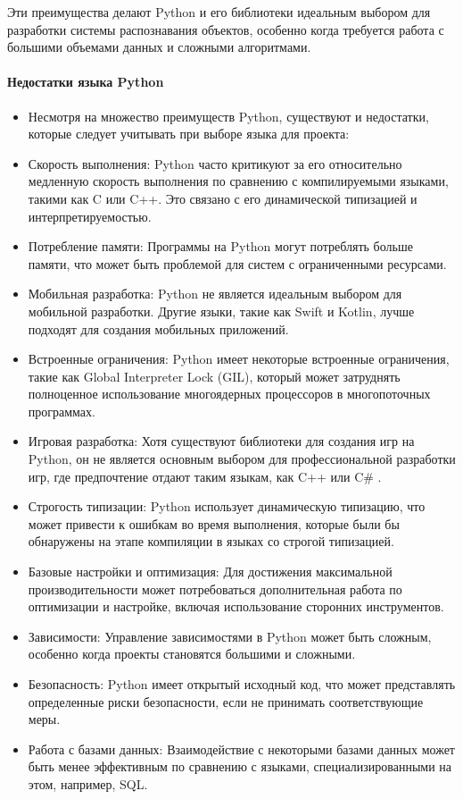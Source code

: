 Эти преимущества делают Python и его библиотеки идеальным выбором для разработки системы распознавания объектов, особенно когда требуется работа с большими объемами данных и сложными алгоритмами.

\paragraph{Недостатки языка Python}

\begin{itemize}
\item Несмотря на множество преимуществ Python, существуют и недостатки, которые следует учитывать при выборе языка для проекта:
\item Скорость выполнения: Python часто критикуют за его относительно медленную скорость выполнения по сравнению с компилируемыми языками, такими как C или C++. Это связано с его динамической типизацией и интерпретируемостью.
\item Потребление памяти: Программы на Python могут потреблять больше памяти, что может быть проблемой для систем с ограниченными ресурсами.
\item Мобильная разработка: Python не является идеальным выбором для мобильной разработки. Другие языки, такие как Swift и Kotlin, лучше подходят для создания мобильных приложений.
\item Встроенные ограничения: Python имеет некоторые встроенные ограничения, такие как Global Interpreter Lock (GIL), который может затруднять полноценное использование многоядерных процессоров в многопоточных программах.
\item Игровая разработка: Хотя существуют библиотеки для создания игр на Python, он не является основным выбором для профессиональной разработки игр, где предпочтение отдают таким языкам, как C++ или C\# .
\item Строгость типизации: Python использует динамическую типизацию, что может привести к ошибкам во время выполнения, которые были бы обнаружены на этапе компиляции в языках со строгой типизацией.
\item Базовые настройки и оптимизация: Для достижения максимальной производительности может потребоваться дополнительная работа по оптимизации и настройке, включая использование сторонних инструментов.
\item Зависимости: Управление зависимостями в Python может быть сложным, особенно когда проекты становятся большими и сложными.
\item Безопасность: Python имеет открытый исходный код, что может представлять определенные риски безопасности, если не принимать соответствующие меры.
\item Работа с базами данных: Взаимодействие с некоторыми базами данных может быть менее эффективным по сравнению с языками, специализированными на этом, например, SQL.
\end{itemize}

